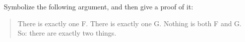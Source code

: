 \
\problempart
Symbolize the following argument, and then give a proof of it:
	\begin{quote}
		There is exactly one F. There is exactly one G. Nothing is both F and G. So: there are exactly two things.%
	\end{quote}





